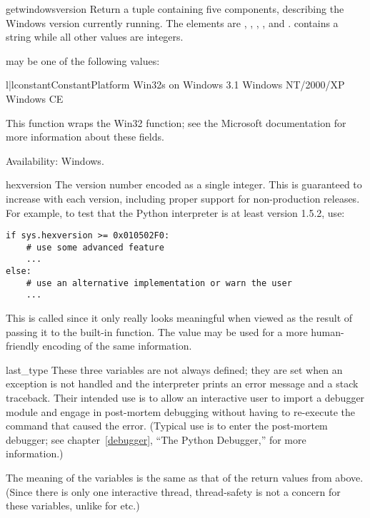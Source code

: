 \begin{funcdesc}{getwindowsversion}{}
  Return a tuple containing five components, describing the Windows 
  version currently running.  The elements are , , 
  , , and .   contains
  a string while all other values are integers.

   may be one of the following values:

  \begin{tableii}{l|l}{constant}{Constant}{Platform}
           {Win32s on Windows 3.1}
         {Windows NT/2000/XP}
         {Windows CE}
  \end{tableii}

  This function wraps the Win32  function;
  see the Microsoft documentation for more information about these
  fields.

  Availability: Windows.
\end{funcdesc}

\begin{datadesc}{hexversion}
  The version number encoded as a single integer.  This is guaranteed
  to increase with each version, including proper support for
  non-production releases.  For example, to test that the Python
  interpreter is at least version 1.5.2, use:

\begin{verbatim}
if sys.hexversion >= 0x010502F0:
    # use some advanced feature
    ...
else:
    # use an alternative implementation or warn the user
    ...
\end{verbatim}

  This is called  since it only really looks
  meaningful when viewed as the result of passing it to the built-in
   function.  The  value may be
  used for a more human-friendly encoding of the same information.
\end{datadesc}

\begin{datadesc}{last_type}
  These three variables are not always defined; they are set when an
  exception is not handled and the interpreter prints an error message
  and a stack traceback.  Their intended use is to allow an
  interactive user to import a debugger module and engage in
  post-mortem debugging without having to re-execute the command that
  caused the error.  (Typical use is  to
  enter the post-mortem debugger; see chapter~\ref{debugger}, ``The
  Python Debugger,'' for more information.)

  The meaning of the variables is the same as that of the return
  values from  above.  (Since there is only one
  interactive thread, thread-safety is not a concern for these
  variables, unlike for  etc.)
\end{datadesc}

